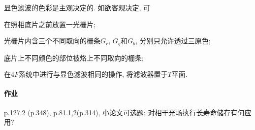 \documentclass{ctexart}
\begin{document}
显色滤波的色彩是主观决定的. 如欲客观决定, 可
\begin{cenum}
    \item 在照相底片之前放置一光栅片;
    \item 光栅片内含三个不同取向的栅条$G_r$, $G_g$和$G_b$, 分别只允许透过三原色;
    \item 底片上不同颜色的部位被烙上不同取向的栅条;
    \item 在4$F$系统中进行与显色滤波相同的操作, 将滤波器置于$T$平面.
\end{cenum}


\paragraph{作业} %
\label{par:作业}

p.127.2 (p.348), p.81.1,2(p.314), 小论文可选题: 对相干光场执行长寿命储存有何应用?




\end{document}
